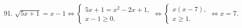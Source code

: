 91. $\sqrt{5x+1}=x-1\Leftrightarrow\begin{cases}5x+1=x^2-2x+1,\\ x-1\geqslant0.\end{cases}
\Leftrightarrow\begin{cases}x(x-7),\\ x\geqslant1.\end{cases}\Leftrightarrow x=7.$\\

